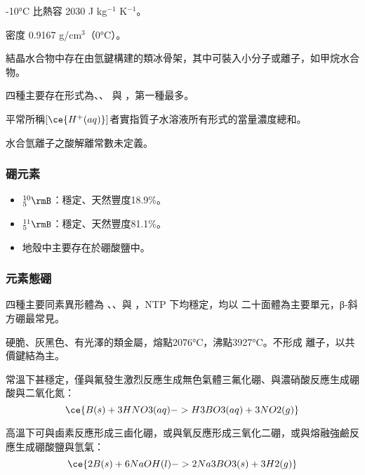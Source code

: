 \documentclass[a4paper,12pt]{report}
\begin{document}
\item -10°C 比熱容 2030 J kg$^{-1}$ K$^{-1}$。
\item 密度 0.9167 g/cm$^3$（0°C）。
\item 結晶水合物中存在由氫鍵構建的類冰骨架，其中可裝入小分子或離子，如甲烷水合物。
\eit
{}
\bit
\item 四種主要存在形式為、、 與 ，第一種最多。
\item 平常所稱$[\ce{H^+(aq)}]$者實指質子水溶液所有形式的當量濃度總和。
\item 水合氫離子之酸解離常數未定義。
\eit
{}
\subsubsection{硼元素}
\begin{itemize}
\item $^{10}_5\rmB$：穩定、天然豐度18.9\%。
\item $^{11}_5\rmB$：穩定、天然豐度81.1\%。
\item 地殼中主要存在於硼酸鹽中。
\end{itemize}
\subsubsection{元素態硼}
\bit
\item 四種主要同素異形體為 、、與 ，NTP 下均穩定，均以  二十面體為主要單元，β-斜方硼最常見。
\item 硬脆、灰黑色、有光澤的類金屬，熔點2076°C，沸點3927°C。不形成  離子，以共價鍵結為主。
\item 常溫下甚穩定，僅與氟發生激烈反應生成無色氣體三氟化硼、與濃硝酸反應生成硼酸與二氧化氮：
\[\ce{B(s) + 3HNO3(aq) -> H3BO3(aq) + 3NO2(g)}\]
\item 高溫下可與鹵素反應形成三鹵化硼，或與氧反應形成三氧化二硼，或與熔融強鹼反應生成硼酸鹽與氫氣：
\[\ce{2B(s) + 6NaOH(l) -> 2Na3BO3(s) + 3H2(g)}\]
\eit
\end{document}

